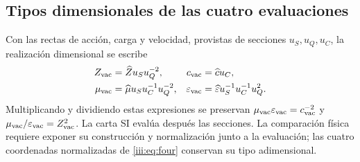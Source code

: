 \subsection{Tipos dimensionales de las cuatro evaluaciones}

Con las rectas de acción, carga y velocidad, provistas de secciones
$u_S,u_Q,u_C$, la realización dimensional se escribe
\begin{align}
 Z_{\rm vac}&=\widehat Z u_Su_Q^{-2},&
 c_{\rm vac}&=\widehat c u_C,\\
 \mu_{\rm vac}&=\widehat\mu u_Su_C^{-1}u_Q^{-2},&
 \varepsilon_{\rm vac}&=\widehat\varepsilon u_S^{-1}u_C^{-1}u_Q^2.
 \label{iii:eq:dimensions}
\end{align}
Multiplicando y dividiendo estas expresiones se preservan
$\mu_{\rm vac}\varepsilon_{\rm vac}=c_{\rm vac}^{-2}$ y
$\mu_{\rm vac}/\varepsilon_{\rm vac}=Z_{\rm vac}^2$.
La carta SI evalúa después las secciones. La comparación física requiere
exponer su construcción y normalización junto a la evaluación; las cuatro
coordenadas normalizadas de \eqref{iii:eq:four} conservan su tipo adimensional.
